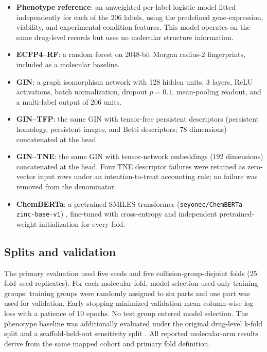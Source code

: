 \documentclass[11pt,a4paper]{article}
\begin{document}
\begin{itemize}
\item \textbf{Phenotype reference}: an unweighted per-label logistic model fitted independently for each of the \num{206} labels, using the predefined gene-expression, viability, and experimental-condition features. This model operates on the same drug-level records but uses no molecular structure information.
\item \textbf{ECFP4--RF}: a random forest on \num{2048}-bit Morgan radius-\num{2} fingerprints, included as a molecular baseline.
\item \textbf{GIN}: a graph isomorphism network \citep{xu2019gin} with \num{128} hidden units, \num{3} layers, ReLU activations, batch normalization, dropout $p=\num{0.1}$, mean-pooling readout, and a multi-label output of \num{206} units.
\item \textbf{GIN--TFP}: the same GIN with tensor-free persistent descriptors (persistent homology, persistent images, and Betti descriptors; \num{78} dimensions) concatenated at the head.
\item \textbf{GIN--TNE}: the same GIN with tensor-network embeddings (\num{192} dimensions) concatenated at the head. Four TNE descriptor failures were retained as zero-vector input rows under an intention-to-treat accounting rule; no failure was removed from the denominator.
\item \textbf{ChemBERTa}: a pretrained SMILES transformer (\texttt{seyonec/ChemBERTa-zinc-base-v1}) \citep{chemberta_2020,chemberta3_2026}, fine-tuned with cross-entropy and independent pretrained-weight initialization for every fold.
\end{itemize}

\subsection{Splits and validation}

The primary evaluation used five seeds and five collision-group-disjoint folds (\num{25} fold--seed replicates). For each molecular fold, model selection used only training groups: training groups were randomly assigned to six parts and one part was used for validation. Early stopping minimized validation mean column-wise log loss with a patience of \num{10} epochs. No test group entered model selection. The phenotype baseline was additionally evaluated under the original drug-level k-fold split and a scaffold-held-out sensitivity split \citep{guo2024scaffold}. All reported molecular-arm results derive from the same mapped cohort and primary fold definition.
\end{document}
